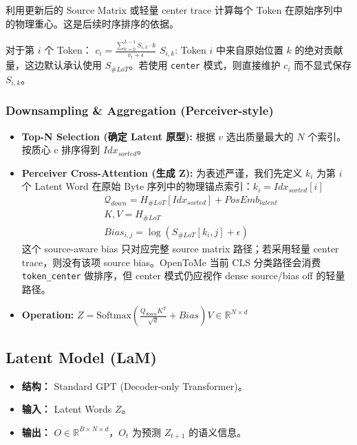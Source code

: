 \documentclass[a4paper,11pt]{article}
\begin{document}
利用更新后的 Source Matrix 或轻量 center trace 计算每个 Token 在原始序列中的物理重心。这是后续时序排序的依据。

对于第 $i$ 个 Token：
    $c_{i} = \frac{\sum_{k=0}^{L-1} S_{i,k} \cdot k}{v_{i} + \epsilon}$
    $S_{i,k}$: Token $i$ 中来自原始位置 $k$ 的绝对贡献量，这边默认承认使用 $S_{\#LoT}$。若使用 \texttt{center} 模式，则直接维护 $c_i$ 而不显式保存 $S_{i,k}$。

\subsubsection{Downsampling \& Aggregation (Perceiver-style)}


\begin{itemize}
    \item \textbf{Top-N Selection (确定 Latent 原型):}
    根据 $v$ 选出质量最大的 $N$ 个索引。按质心 c 排序得到 $Idx_{sorted}$。
    
    \item \textbf{Perceiver Cross-Attention (生成 Z):}
    为表述严谨，我们先定义 $k_i$ 为第 $i$ 个 Latent Word 在原始 Byte 序列中的物理锚点索引：$k_i = Idx_{sorted}[i]$
    \begin{align}
        &\mathcal{Q}_{down} = H_{\#LoT}[Idx_{sorted}] + PosEmb_{latent} \\
        &K, V = H_{\#LoT} \\
        &Bias_{i,j} = \log(S_{\#LoT}[k_i, j] + \epsilon)
    \end{align}
    这个 source-aware bias 只对应完整 source matrix 路径；若采用轻量 center trace，则没有该项 source bias。OpenToMe 当前 CLS 分类路径会消费 \texttt{token\_center} 做排序，但 center 模式仍应视作 dense source/bias off 的轻量路径。
    
    \item \textbf{Operation:}
        $Z = \text{Softmax}\left(\frac{Q_{down}K^{T}}{\sqrt{d}} + Bias\right)V\in \mathbb{R}^{N \times d}$
\end{itemize}

\subsection{Latent Model (LaM)}
\begin{itemize}
    \item \textbf{结构：} Standard GPT (Decoder-only Transformer)。
    \item \textbf{输入：} Latent Words $Z$。
    \item \textbf{输出：} $O \in \mathbb{R}^{B \times N \times d}$，$O_{t}$ 为预测 $Z_{t+1}$ 的语义信息。
\end{itemize}
\end{document}
